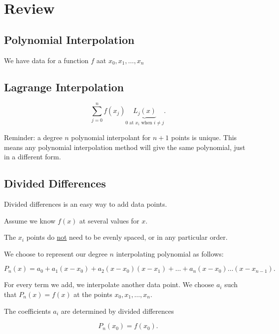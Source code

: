 \section{Review}

\subsection{Polynomial Interpolation}
We have data for a function $f$ aat $x_0, x_1, \dots, x_n$

\subsection{Lagrange Interpolation}
\[
  \sum_{j=0}^n f(x_j) \underbrace{L_j(x)}_{0 \text{ at } x_i \text{ when } i \neq j}
.\]

Reminder: a degree $n$ polynomial interpolant for $n+1$ points is unique. This
means any polynomial interpolation method will give the same polynomial, just in
a different form.

\subsection{Divided Differences}

Divided differences is an easy way to add data points.

Assume we know $f(x)$ at several values for $x$.


The $x_i$ points do \uline{not} need to be evenly spaced, or in any particular order.

We choose to represent our degree $n$ interpolating polynomial as follows:

\[
  P_n(x) = a_0 + a_1 (x-x_0) + a_2 (x-x_0) (x-x_1) + \dots + a_n (x-x_0) \dots (x-x_{n-1})
.\]

For every term we add, we interpolate another data point. We choose $a_i$ such
that $P_n(x) = f(x)$ at the points $x_0, x_1, \dots, x_n$.

The coefficients $a_i$ are determined by divided differences

\[
P_n (x_0) = f(x_0)
.\]

